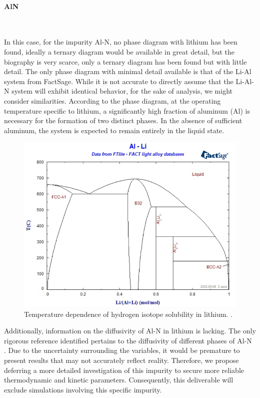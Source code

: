 \paragraph{AlN}~\\
\vspace{1mm} %

In this case, for the impurity Al-N, no phase diagram with lithium has been found, ideally a ternary diagram would be available in great detail, but the biography is very scarce, only a 
ternary diagram has been found but with little detail.\cite{Zhu}
The only phase diagram with minimal detail available is that of the Li-Al system from FactSage. While it is not accurate to directly assume 
that the Li-Al-N system will exhibit identical behavior, for the sake of analysis, we might consider similarities. According to the phase diagram, at the 
operating temperature specific to lithium, a significantly high fraction of aluminum (Al) is necessary for the formation of two distinct phases. In the absence 
of sufficient aluminum, the system is expected to remain entirely in the liquid state.

\begin{figure}[H]
    \centering
    \includegraphics[width=0.9\linewidth]{al_li_diagram.png}
    \caption{Temperature dependence of hydrogen isotope solubility in lithium. \cite{Bale2016}.}
    \label{fig:al_li_diagram}
\end{figure}


Additionally, information on the diffusivity of Al-N in lithium is lacking. The only rigorous reference identified pertains to the diffusivity of different phases of Al-N \cite{CROWLEY2022231973}.
Due to the uncertainty surrounding the variables, it would be premature to present results that may not accurately reflect reality. Therefore, we propose deferring a more detailed investigation of this 
impurity to secure more reliable thermodynamic and kinetic parameters. Consequently, this deliverable will exclude simulations involving this specific impurity.

